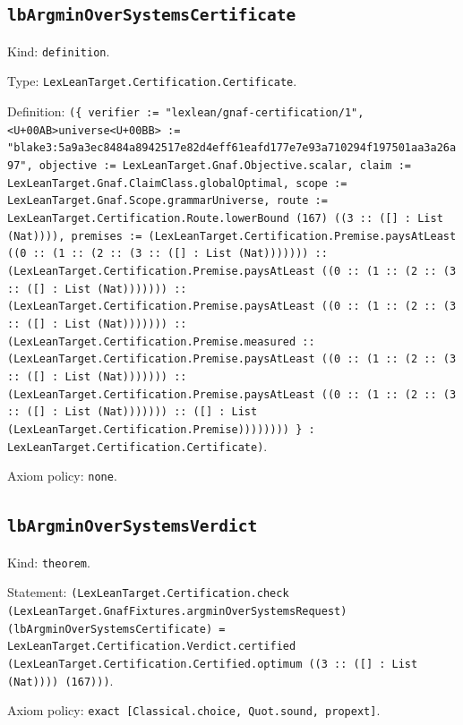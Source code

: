\documentclass[11pt]{article}
\begin{document}
\subsection*{\texttt{lbArgminOverSystemsCertificate}}
\noindent Kind: \texttt{definition}.\par
\noindent Type: \texttt{LexLeanTarget.Certification.Certificate}.\par
\noindent Definition: \texttt{(\{ verifier := "lexlean/gnaf-certification/1", <U+00AB>universe<U+00BB> := "blake3:5a9a3ec8484a8942517e82d4eff61eafd177e7e93a710294f197501aa3a26a97", objective := LexLeanTarget.Gnaf.Objective.scalar, claim := LexLeanTarget.Gnaf.ClaimClass.globalOptimal, scope := LexLeanTarget.Gnaf.Scope.grammarUniverse, route := LexLeanTarget.Certification.Route.lowerBound (167) ((3 :: ([] : List (Nat)))), premises := (LexLeanTarget.Certification.Premise.paysAtLeast ((0 :: (1 :: (2 :: (3 :: ([] : List (Nat))))))) :: (LexLeanTarget.Certification.Premise.paysAtLeast ((0 :: (1 :: (2 :: (3 :: ([] : List (Nat))))))) :: (LexLeanTarget.Certification.Premise.paysAtLeast ((0 :: (1 :: (2 :: (3 :: ([] : List (Nat))))))) :: (LexLeanTarget.Certification.Premise.measured :: (LexLeanTarget.Certification.Premise.paysAtLeast ((0 :: (1 :: (2 :: (3 :: ([] : List (Nat))))))) :: (LexLeanTarget.Certification.Premise.paysAtLeast ((0 :: (1 :: (2 :: (3 :: ([] : List (Nat))))))) :: ([] : List (LexLeanTarget.Certification.Premise)))))))) \} : LexLeanTarget.Certification.Certificate)}.\par
\noindent Axiom policy: \texttt{none}.\par
\subsection*{\texttt{lbArgminOverSystemsVerdict}}
\noindent Kind: \texttt{theorem}.\par
\noindent Statement: \texttt{(LexLeanTarget.Certification.check (LexLeanTarget.GnafFixtures.argminOverSystemsRequest) (lbArgminOverSystemsCertificate) = LexLeanTarget.Certification.Verdict.certified (LexLeanTarget.Certification.Certified.optimum ((3 :: ([] : List (Nat)))) (167)))}.\par
\noindent Axiom policy: \texttt{exact [Classical.choice, Quot.sound, propext]}.\par
\end{document}
